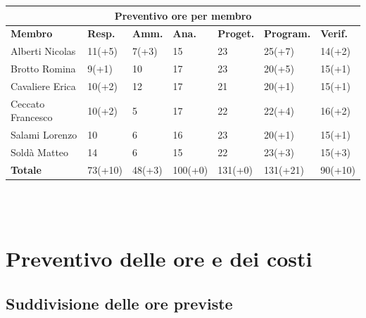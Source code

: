 \documentclass[a4paper, 12pt]{article}
\begin{document}
\begin{center}
	\begin{tabularx}{\textwidth}{|X|X|X|X|X|X|X|}
		\hline
		\multicolumn{7}{|c|}{\textbf{Preventivo ore per membro}}                                               \\
		\hline
		\hline
		\textbf{Membro}   & \textbf{Resp.}    & \textbf{Amm.}   & \textbf{Ana.} &
		\textbf{Proget.}  & \textbf{Program.} & \textbf{Verif.}                                                \\
		\hline
		Alberti Nicolas   & 11(+5)            & 7(+3)           & 15            & 23      & 25(+7)   & 14(+2)  \\
		\hline
		Brotto Romina     & 9(+1)             & 10              & 17            & 23      & 20(+5)   & 15(+1)  \\
		\hline
		Cavaliere Erica   & 10(+2)            & 12              & 17            & 21      & 20(+1)   & 15(+1)  \\
		\hline
		Ceccato Francesco & 10(+2)            & 5               & 17            & 22      & 22(+4)   & 16(+2)  \\
		\hline
		Salami Lorenzo    & 10                & 6               & 16            & 23      & 20(+1)   & 15(+1)  \\
		\hline
		Soldà Matteo      & 14                & 6               & 15            & 22      & 23(+3)   & 15(+3)  \\
		\hline
		\hline
		\textbf{Totale}   & 73(+10)           & 48(+3)          & 100(+0)       & 131(+0) & 131(+21) & 90(+10) \\
		\hline
	\end{tabularx}\\[8pt]
	\mbox{}\\
\end{center}

\newpage

\section{Preventivo delle ore e dei costi}

\subsection{Suddivisione delle ore previste}
\end{document}

